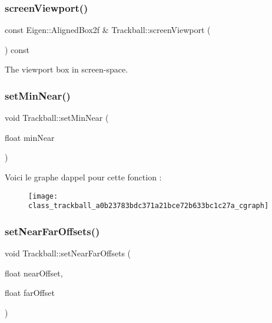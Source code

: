 \mbox{\label{class_trackball_a42799fa68d03eab4dbcee55e3dfea55e}} 
\subsubsection{\texorpdfstring{screen\+Viewport()}{screenViewport()}}
{\footnotesize\ttfamily const Eigen\+::\+Aligned\+Box2f \& Trackball\+::screen\+Viewport (\begin{DoxyParamCaption}{ }\end{DoxyParamCaption}) const}



The viewport box in screen-\/space. 

\mbox{\label{class_trackball_a0b23783bdc371a21bce72b633bc1c27a}} 
\subsubsection{\texorpdfstring{set\+Min\+Near()}{setMinNear()}}
{\footnotesize\ttfamily void Trackball\+::set\+Min\+Near (\begin{DoxyParamCaption}\item[{float}]{min\+Near }\end{DoxyParamCaption})}

Voici le graphe d\textquotesingle{}appel pour cette fonction \+:\nopagebreak
\begin{figure}[H]
\begin{center}
\leavevmode
\texttt{[image: class\_trackball\_a0b23783bdc371a21bce72b633bc1c27a\_cgraph]}
\end{center}
\end{figure}
\mbox{\label{class_trackball_adb8173ceaf1d83d324751a6379f769ef}} 
\subsubsection{\texorpdfstring{set\+Near\+Far\+Offsets()}{setNearFarOffsets()}}
{\footnotesize\ttfamily void Trackball\+::set\+Near\+Far\+Offsets (\begin{DoxyParamCaption}\item[{float}]{near\+Offset,  }\item[{float}]{far\+Offset }\end{DoxyParamCaption})}

